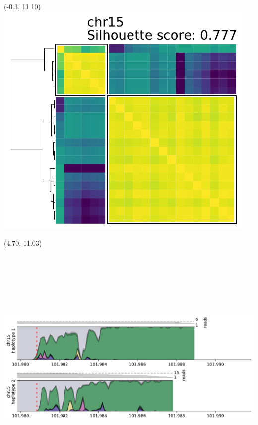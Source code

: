 \documentclass{article}
\begin{document}
\begin{textblock}{13}(-0.3, 11.10) \includegraphics[width=5in]{assets/HG002-q_arm-levenshtein-clustermaps/chr15.pdf}   \end{textblock}
\begin{textblock}{13}(4.70, 11.03) \includegraphics[height=5in]{assets/HG002-q_arm-levenshtein-densityplots/chr15.pdf} \end{textblock}
\end{document}
